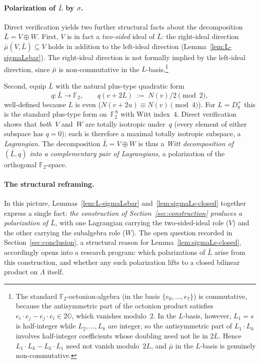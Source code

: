 \documentclass[twoside,english]{paper}
\numberwithin{equation}{section}
\numberwithin{figure}{section}
\theoremstyle{definition}
\theoremstyle{remark}
\newcommand{\OO}{\mathbb{O}}          %
\newcommand{\FF}{\mathbb{F}}
\newcommand{\LL}{\Lambda}             %
\newcommand{\Nrm}{N}                  %
\begin{document}
\paragraph{Polarization of $\bar L$ by $\sigma$.}
Direct verification yields two further structural facts about the
decomposition $\bar L = V \oplus W$.  First, $V$ is in fact a
\emph{two-sided} ideal of $\bar L$: the right-ideal direction
$\bar\mu(V, \bar L) \subseteq V$ holds in addition to the left-ideal
direction (Lemma~\ref{lem:L-sigmaLsbar}).  The right-ideal direction
is not formally implied by the left-ideal direction, since $\bar\mu$
is non-commutative in the $L$-basis.\footnote{The standard
$\FF_2$-octonion-algebra (in the basis $\{e_0,\ldots,e_7\}$) is
commutative, because the antisymmetric part of the octonion product
satisfies $e_i \cdot e_j - e_j \cdot e_i \in 2\OO$, which vanishes
modulo~$2$. In the $L$-basis, however, $L_1 = s$ is half-integer
while $L_2, \ldots, L_8$ are integer, so the antisymmetric part of
$L_1 \cdot L_k$ involves half-integer coefficients whose doubling
need not lie in $2L$. Hence $L_1 \cdot L_k - L_k \cdot L_1$ need not
vanish modulo~$2L$, and $\bar\mu$ in the $L$-basis is genuinely
non-commutative.}

Second, equip $\bar L$ with the natural plus-type quadratic form
\[
  q \colon \bar L \to \FF_2, \qquad q(v + 2L) \;:=\; \Nrm(v)/2 \pmod 2,
\]
well-defined because $L$ is even
($\Nrm(v + 2u) \equiv \Nrm(v) \pmod 4$).  For $L = D_8^+$ this is the
standard plus-type form on~$\FF_2^{\,8}$ with Witt index~$4$.  Direct
verification shows that \emph{both}~$V$ and~$W$ are totally isotropic
under~$q$ (every element of either subspace has $q = 0$); each is
therefore a maximal totally isotropic subspace, a
\emph{Lagrangian}.  The decomposition $\bar L = V \oplus W$ is thus a
\emph{Witt decomposition of $(\bar L, q)$ into a complementary pair
of Lagrangians}, a polarization of the orthogonal $\FF_2$-space.

\paragraph{The structural reframing.}
In this picture, Lemmas~\ref{lem:L-sigmaLsbar}
and~\ref{lem:sigmaLs-closed} together express a single fact:
\emph{the construction of Section~\ref{sec:construction} produces a
polarization of $\bar L$}, with one Lagrangian carrying the
two-sided-ideal role ($V$) and the other carrying the subalgebra
role ($W$).  The open question recorded in
Section~\ref{sec:conclusion}, a structural reason for
Lemma~\ref{lem:sigmaLs-closed}, accordingly opens into a research
program: which polarizations of $\bar L$ arise from this
construction, and whether any such polarization lifts to a closed
bilinear product on $\LL$ itself.
\end{document}
